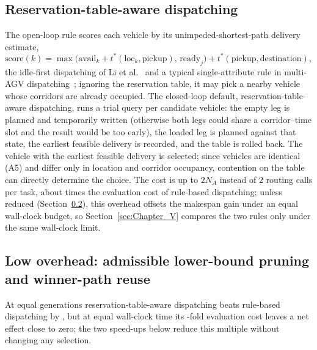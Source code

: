 \subsection{Reservation-table-aware dispatching}
\label{sec:dispatch}

The open-loop rule scores each vehicle by its unimpeded-shortest-path delivery estimate,
\begin{equation}
\label{eq:rule}
\mathrm{score}(k)=\max\bigl(\mathrm{avail}_k+t^{*}(\mathrm{loc}_k,\text{pickup}),\,
\mathrm{ready}_j\bigr)+t^{*}(\text{pickup},\text{destination}),
\end{equation}
the idle-first dispatching of Li et al.~\cite{li2026framework} and a typical single-attribute rule in multi-AGV dispatching~\cite{lu2022agv}; ignoring the reservation table, it may pick a nearby vehicle whose corridors are already occupied.
The closed-loop default, reservation-table-aware dispatching, runs a trial query per candidate vehicle: the empty leg is planned and temporarily written (otherwise both legs could share a corridor--time slot and the result would be too early), the loaded leg is planned against that state, the earliest feasible delivery is recorded, and the table is rolled back.
The vehicle with the earliest feasible delivery is selected; since vehicles are identical (A5) and differ only in location and corridor occupancy, contention on the table can directly determine the choice.
The cost is up to $2N_A$ instead of $2$ routing calls per task, about \CostMultBefore{} times the evaluation cost of rule-based dispatching; unless reduced (Section~\ref{sec:speedup}), this overhead offsets the makespan gain under an equal wall-clock budget, so Section~\ref{sec:Chapter_V} compares the two rules only under the same wall-clock limit.

\subsection{Low overhead: admissible lower-bound pruning and winner-path reuse}
\label{sec:speedup}

At equal generations reservation-table-aware dispatching beats rule-based dispatching by \GainProbeSameGen{}, but at equal wall-clock time its \CostMultBefore{}-fold evaluation cost leaves a net effect close to zero; the two speed-ups below reduce this multiple without changing any selection.

